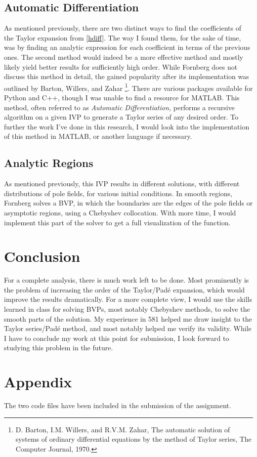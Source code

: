 \documentclass[12pt]{article}
\begin{document}
\subsection{Automatic Differentiation}
As mentioned previously, there are two distinct ways to find the coefficients of the Taylor expansion from \eqref{hdiff}. The way I found them, for the sake of time, was by finding an analytic expression for each coefficient in terms of the previous ones. The second method would indeed be a more effective method and mostly likely yield better results for sufficiently high order. While Fornberg does not discuss this method in detail, the gained popularity after its implementation was outlined by Barton, Willers, and Zahar \footnote{D. Barton, I.M. Willers, and R.V.M. Zahar, The automatic solution of systems of ordinary differential equations by the method of Taylor series, The Computer Journal, 1970.}. There are various packages available for Python and C++, though I was unable to find a resource for MATLAB. This method, often referred to as \emph{Automatic Differentiation,} performs a recursive algorithm on a given IVP to generate a Taylor series of any desired order. To further the work I've done in this research, I would look into the implementation of this method in MATLAB, or another language if necessary. 

\subsection{Analytic Regions}
As mentioned previously, this IVP results in different solutions, with different distributions of pole fields, for various initial conditions. In smooth regions, Fornberg solves a BVP, in which the boundaries are the edges of the pole fields or asymptotic regions, using a Chebyshev collocation. With more time, I would implement this part of the solver to get a full visualization of the function.  

\section{Conclusion}
For a complete analysis, there is much work left to be done. Most prominently is the problem of increasing the order of the Taylor/Pad\'{e} expansion, which would improve the results dramatically. For a more complete view, I would use the skills learned in class for solving BVPs, most notably Chebyshev methods, to solve the smooth parts of the solution. My experience in 581 helped me draw insight to the Taylor series/Pad\'{e} method, and most notably helped me verify its validity. While I have to conclude my work at this point for submission, I look forward to studying this problem in the future. 

\newpage

\section{Appendix}
The two code files have been included in the submission of the assignment. 
\end{document}
